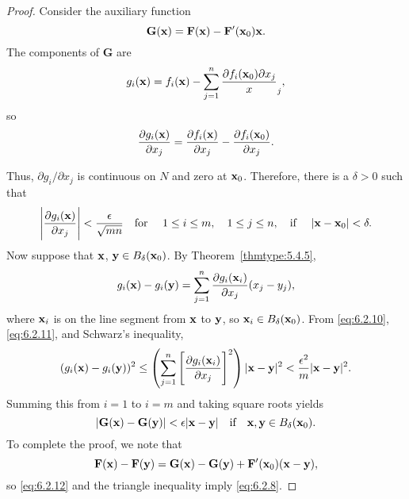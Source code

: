 \begin{proof}
 Consider the auxiliary function
\begin{equation} \label{eq:6.2.9}
\mathbf{G}(\mathbf{ x})=\mathbf{F}(\mathbf{ x})-\mathbf{F}'(\mathbf{ x}_0)\mathbf{ x}.
\end{equation}
The components of $\mathbf{G}$ are
$$
g_i(\mathbf{ x})=f_i(\mathbf{ x})-\sum_{j=1}^n
\frac{\partial f_i(\mathbf{ x}_{0})
\partial x_j} x_j,
$$
so
$$
\frac{\partial g_i(\mathbf{ x})}{\partial x_j}=
\frac{\partial f_i(\mathbf{ x})}
{\partial x_j}-\frac{\partial f_i(\mathbf{ x}_0)}{\partial x_j}.
$$

Thus, $\partial g_i/\partial x_j$ is continuous on $N$ and zero at
$\mathbf{ x}_0$. Therefore, there is a $\delta>0$ such that
\begin{equation}\label{eq:6.2.10}
\left|\frac{\partial g_i(\mathbf{ x})}{\partial x_j}\right|<\frac{\epsilon}{
\sqrt{mn}}\mbox{\quad for \quad}1\le i\le m,\quad 1\le j\le n,
\mbox{\quad if \quad}
|\mathbf{ x}-\mathbf{ x}_0|<\delta.
\end{equation}
Now suppose that $\mathbf{ x}$, $\mathbf{ y}\in B_\delta(\mathbf{ x}_0)$. By
Theorem~\ref{thmtype:5.4.5},
\begin{equation}\label{eq:6.2.11}
g_i(\mathbf{ x})-g_i(\mathbf{ y})=\sum_{j=1}^n
\frac{\partial g_i(\mathbf{ x}_i)}{\partial x_j}(x_j-y_j),
\end{equation}
where $\mathbf{ x}_i$ is on the line segment from $\mathbf{ x}$ to $\mathbf{ y}$,
so  $\mathbf{ x}_i\in B_\delta(\mathbf{ x}_0)$. From \eqref{eq:6.2.10},
\eqref{eq:6.2.11}, and Schwarz's inequality,
$$
(g_i(\mathbf{ x})-g_i(\mathbf{ y}))^2\le\left(\sum_{j=1}^n\left[\frac{\partial
g_i
(\mathbf{ x}_i)}{\partial x_j}\right]^2\right)
|\mathbf{ x}-\mathbf{ y}|^2
<\frac{\epsilon^2}{ m} |\mathbf{ x}-\mathbf{ y}|^2.
$$
Summing this from $i=1$ to $i=m$ and taking square roots yields
\begin{equation}\label{eq:6.2.12}
|\mathbf{G}(\mathbf{ x})-\mathbf{G}(\mathbf{ y})|<\epsilon
|\mathbf{ x}-\mathbf{ y}|
\mbox{\quad if\quad}\mathbf{ x}, \mathbf{ y}\in B_\delta(\mathbf{ x}_0).
\end{equation}
To complete the proof, we note that
\begin{equation}\label{eq:6.2.13}
\mathbf{F}(\mathbf{ x})-\mathbf{F}(\mathbf{ y})=
\mathbf{G}(\mathbf{ x})-\mathbf{G}(\mathbf{ y})+\mathbf{F}'(\mathbf{ x}_0)(\mathbf{ x}-\mathbf{ y}),
\end{equation}
 so \eqref{eq:6.2.12} and the triangle inequality imply \eqref{eq:6.2.8}.
\end{proof}



